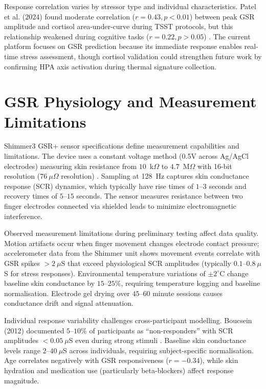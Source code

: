 \documentclass{report}
\begin{document}
    Response correlation varies by stressor type and individual characteristics. Patel et al. (2024) found moderate correlation ($r = 0.43, p < 0.01$) between peak GSR amplitude and cortisol area-under-curve during TSST protocols, but this relationship weakened during cognitive tasks ($r = 0.22, p > 0.05$) \cite{patel2024}. The current platform focuses on GSR prediction because its immediate response enables real-time stress assessment, though cortisol validation could strengthen future work by confirming HPA axis activation during thermal signature collection.


    \section{GSR Physiology and Measurement Limitations}
    \label{sec:gsr_physiology}

    Shimmer3 GSR+ sensor specifications define measurement capabilities and limitations. The device uses a constant voltage method (0.5V across Ag/AgCl electrodes) measuring skin resistance from $10$~k$\Omega$ to $4.7$~M$\Omega$ with 16-bit resolution ($76~\mu\Omega$ resolution) \cite{shimmerdoc8}. Sampling at 128~Hz captures skin conductance response (SCR) dynamics, which typically have rise times of $1$--$3$ seconds and recovery times of $5$--$15$ seconds. The sensor measures resistance between two finger electrodes connected via shielded leads to minimize electromagnetic interference.

    Observed measurement limitations during preliminary testing affect data quality. Motion artifacts occur when finger movement changes electrode contact pressure; accelerometer data from the Shimmer unit shows movement events correlate with GSR spikes $>2~\mu$S that exceed physiological SCR amplitudes (typically $0.1$--$0.8~\mu$S for stress responses). Environmental temperature variations of $\pm 2^{\circ}$C change baseline skin conductance by $15$--$25$\%, requiring temperature logging and baseline normalisation. Electrode gel drying over $45$--$60$ minute sessions causes conductance drift and signal attenuation.

    Individual response variability challenges cross-participant modelling. Boucsein (2012) documented $5$--$10$\% of participants as ``non-responders'' with SCR amplitudes $<0.05~\mu$S even during strong stimuli \cite{boucsein2012}. Baseline skin conductance levels range $2$--$40~\mu$S across individuals, requiring subject-specific normalisation. Age correlates negatively with GSR responsiveness ($r = -0.34$), while skin hydration and medication use (particularly beta-blockers) affect response magnitude.
\end{document}
